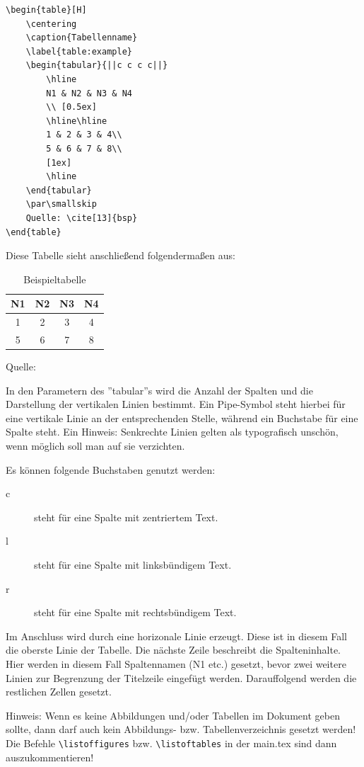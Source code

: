 \begin{lstlisting}
\begin{table}[H]
	\centering
	\caption{Tabellenname}
	\label{table:example}
	\begin{tabular}{||c c c c||}
		\hline
		N1 & N2 & N3 & N4
		\\ [0.5ex]
		\hline\hline
		1 & 2 & 3 & 4\\
		5 & 6 & 7 & 8\\
		[1ex]
		\hline
	\end{tabular}
	\par\smallskip 
	Quelle: \cite[13]{bsp}
\end{table}
\end{lstlisting}

Diese Tabelle sieht anschließend folgendermaßen aus:
\begin{table}[H]
	\centering
	\caption{Beispieltabelle}
	\label{table:example}
	\begin{tabular}{||c c c c||}
		\hline
		N1 & N2 & N3 & N4
		\\ [0.5ex]
		\hline\hline
		1 & 2 & 3 & 4\\
		5 & 6 & 7 & 8\\
		[1ex]
		\hline
	\end{tabular}
	\par\smallskip 
	Quelle: \cite[13]{bsp}
\end{table}

In den Parametern des ''tabular''s wird die Anzahl der Spalten und die Darstellung der vertikalen Linien bestimmt. 
Ein Pipe-Symbol steht hierbei für eine vertikale Linie an der entsprechenden Stelle, während ein Buchstabe für eine Spalte steht. 
Ein Hinweis: Senkrechte Linien gelten als typografisch unschön, wenn möglich soll man auf sie verzichten.

Es können folgende Buchstaben genutzt werden:
\begin{description}
	\item[c] steht für eine Spalte mit zentriertem Text.
	\item[l] steht für eine Spalte mit linksbündigem Text.
	\item[r] steht für eine Spalte mit rechtsbündigem Text.
\end{description}

Im Anschluss wird durch \befehl{\hline} eine horizonale Linie erzeugt. 
Diese ist in diesem Fall die oberste Linie der Tabelle. 
Die nächste Zeile beschreibt die Spalteninhalte. 
Hier werden in diesem Fall Spaltennamen (N1 etc.) gesetzt, bevor zwei weitere Linien zur Begrenzung der Titelzeile eingefügt werden. 
Darauffolgend werden die restlichen Zellen gesetzt.

Hinweis: Wenn es keine Abbildungen und/oder Tabellen im Dokument geben sollte, dann darf auch kein Abbildungs- bzw. Tabellenverzeichnis gesetzt werden! Die Befehle \verb|\listoffigures| bzw. \verb|\listoftables| in der main.tex sind dann auszukommentieren!